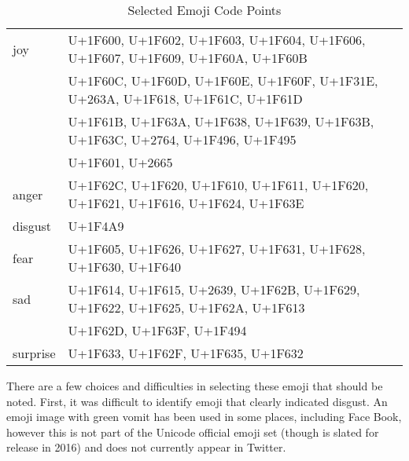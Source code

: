 \documentclass[10pt, a4paper]{article}
\begin{document}
\begin{table}
	\begin{tabular}{ll}
joy      & {\tiny U+1F600, U+1F602, U+1F603, U+1F604, U+1F606, U+1F607, U+1F609, U+1F60A, U+1F60B} \\
         & {\tiny U+1F60C, U+1F60D, U+1F60E, U+1F60F, U+1F31E, U+263A, U+1F618, U+1F61C, U+1F61D} \\
         & {\tiny U+1F61B, U+1F63A, U+1F638, U+1F639, U+1F63B, U+1F63C, U+2764, U+1F496, U+1F495} \\
         & {\tiny U+1F601, U+2665} \\
anger    & {\tiny U+1F62C, U+1F620, U+1F610, U+1F611, U+1F620, U+1F621, U+1F616, U+1F624, U+1F63E} \\
disgust  & {\tiny U+1F4A9} \\
fear     & {\tiny U+1F605, U+1F626, U+1F627, U+1F631, U+1F628, U+1F630, U+1F640} \\
sad      & {\tiny U+1F614, U+1F615, U+2639, U+1F62B, U+1F629, U+1F622, U+1F625, U+1F62A, U+1F613} \\
         & {\tiny U+1F62D, U+1F63F, U+1F494} \\
surprise & {\tiny U+1F633, U+1F62F, U+1F635, U+1F632} \\
	\end{tabular}
	\caption{Selected Emoji Code Points}
	\label{tab:selected-emoji-codpoints}
\end{table}

There are a few choices and difficulties in selecting these emoji that should be noted.
First, it was difficult to identify emoji that clearly indicated disgust. 
An emoji image with green vomit has been used in some places, including Face Book, however this is not part of the Unicode official emoji set (though is slated for release in 2016) and does not currently appear in Twitter.
\end{document}
